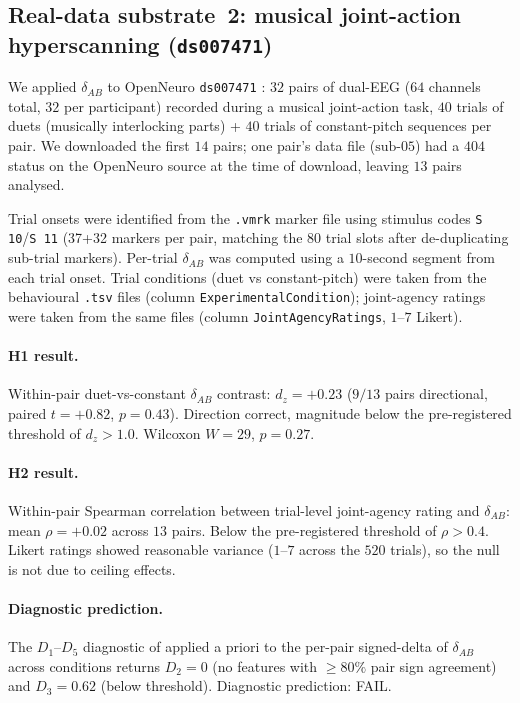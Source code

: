 \documentclass[11pt,a4paper]{article}
\begin{document}
\subsection{Real-data substrate~2: musical joint-action hyperscanning (\texttt{ds007471})}\label{sec:results-music}

We applied $\delta_{AB}$ to OpenNeuro \texttt{ds007471} \citep{ZhouHyperscanning2026}: $32$ pairs of dual-EEG ($64$ channels total, $32$ per participant) recorded during a musical joint-action task, $40$ trials of duets (musically interlocking parts) + $40$ trials of constant-pitch sequences per pair. We downloaded the first $14$ pairs; one pair's data file ($\text{sub-05}$) had a $404$ status on the OpenNeuro source at the time of download, leaving $13$ pairs analysed.

Trial onsets were identified from the \texttt{.vmrk} marker file using stimulus codes \texttt{S\,10}/\texttt{S\,11} (37+32 markers per pair, matching the 80 trial slots after de-duplicating sub-trial markers). Per-trial $\delta_{AB}$ was computed using a $10$-second segment from each trial onset. Trial conditions (duet vs constant-pitch) were taken from the behavioural \texttt{.tsv} files (column \texttt{ExperimentalCondition}); joint-agency ratings were taken from the same files (column \texttt{JointAgencyRatings}, $1$--$7$ Likert).

\paragraph{H1 result.} Within-pair duet-vs-constant $\delta_{AB}$ contrast: $d_z = +0.23$ ($9/13$ pairs directional, paired $t = +0.82$, $p = 0.43$). Direction correct, magnitude below the pre-registered threshold of $d_z > 1.0$. Wilcoxon $W = 29$, $p = 0.27$.

\paragraph{H2 result.} Within-pair Spearman correlation between trial-level joint-agency rating and $\delta_{AB}$: mean $\rho = +0.02$ across $13$ pairs. Below the pre-registered threshold of $\rho > 0.4$. Likert ratings showed reasonable variance ($1$--$7$ across the $520$ trials), so the null is not due to ceiling effects.

\paragraph{Diagnostic prediction.} The $D_1$--$D_5$ diagnostic of \citep{SmartClosureDistance} applied a priori to the per-pair signed-delta of $\delta_{AB}$ across conditions returns $D_2 = 0$ (no features with $\geq 80\%$ pair sign agreement) and $D_3 = 0.62$ (below threshold). Diagnostic prediction: FAIL.
\end{document}

